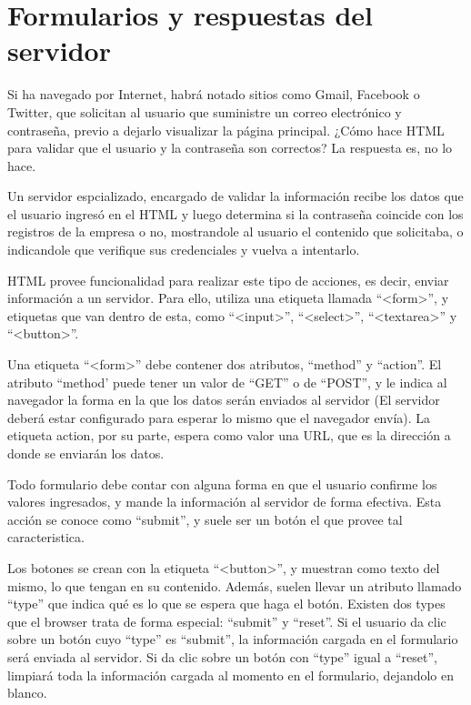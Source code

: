 \section{Formularios y respuestas del servidor}

Si ha navegado por Internet, habrá notado sitios como Gmail, Facebook o Twitter,
que solicitan al usuario que suministre un correo electrónico y contraseña,
previo a dejarlo visualizar la página principal. ¿Cómo hace HTML para validar
que el usuario y la contraseña son correctos? La respuesta es, no lo hace.

Un servidor espcializado, encargado de validar la información recibe los datos
que el usuario ingresó en el HTML y luego determina si la contraseña coincide
con los registros de la empresa o no, mostrandole al usuario el contenido que
solicitaba, o indicandole que verifique sus credenciales y vuelva a intentarlo.

HTML provee funcionalidad para realizar este tipo de acciones, es decir, enviar
información a un servidor. Para ello, utiliza una etiqueta llamada ``<form>'',
y etiquetas que van dentro de esta, como ``<input>'', ``<select>'', ``<textarea>''
y ``<button>''.

Una etiqueta ``<form>'' debe contener dos atributos, ``method'' y ``action''.
El atributo ``method' puede tener un valor de ``GET'' o de ``POST'', y le indica
al navegador la forma en la que los datos serán enviados al servidor (El servidor
deberá estar configurado para esperar lo mismo que el navegador envía). La
etiqueta action, por su parte, espera como valor una URL, que es la dirección
a donde se enviarán los datos.

Todo formulario debe contar con alguna forma en que el usuario confirme los
valores ingresados, y mande la información al servidor de forma efectiva. Esta
acción se conoce como ``submit'', y suele ser un botón el que provee tal
caracteristica.

Los botones se crean con la etiqueta ``<button>'', y muestran como texto del
mismo, lo que tengan en su contenido. Además, suelen llevar un atributo llamado
``type'' que indica qué es lo que se espera que haga el botón. Existen dos types
que el browser trata de forma especial: ``submit'' y ``reset''. Si el usuario
da clic sobre un botón cuyo ``type'' es ``submit'', la información cargada
en el formulario será enviada al servidor. Si da clic sobre un botón con ``type''
igual a ``reset'', limpiará toda la información cargada al momento en el formulario,
dejandolo en blanco.

